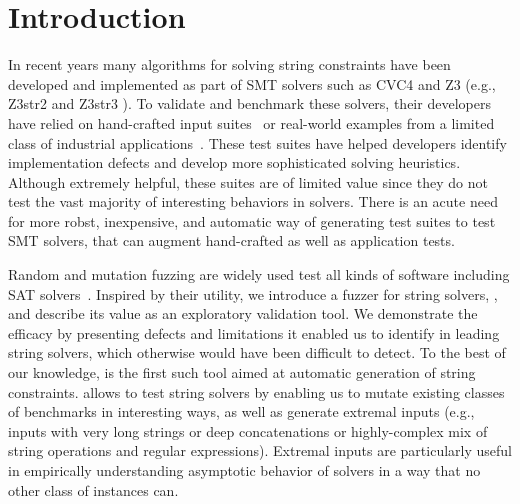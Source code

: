 \section{Introduction}

In recent years many algorithms for solving string constraints have
been developed and implemented as part of SMT solvers such as CVC4
\cite{cvc4} and Z3 (e.g., Z3str2 \cite{z3str2} and Z3str3
\cite{z3str3}). To validate and benchmark these solvers, their
developers have relied on hand-crafted input
suites~\cite{cvc4-tests,z3str3-tests,z3str2-tests} or real-world
examples from a limited class of industrial
applications~\cite{kaluza,kausler}. These test suites have helped
developers identify implementation defects and develop more
sophisticated solving heuristics. Although extremely helpful, these
suites are of limited value since they do not test the vast majority
of interesting behaviors in solvers. There is an acute need for more
robst, inexpensive, and automatic way of generating test suites to
test SMT solvers, that can augment hand-crafted as well as application
tests.
    
Random and mutation fuzzing are widely used test all kinds of software
including SAT solvers~\cite{}. Inspired by their utility, we introduce
a fuzzer for string solvers, \fuzzer{}, and describe its value as an
exploratory validation tool. We demonstrate the efficacy \fuzzer{} by
presenting defects and limitations it enabled us to identify in
leading string solvers, which otherwise would have been difficult to
detect. To the best of our knowledge, \fuzzer{} is the first such tool
aimed at automatic generation of string constraints. \fuzzer{} allows
to test string solvers by enabling us to mutate existing classes of
benchmarks in interesting ways, as well as generate extremal inputs
(e.g., inputs with very long strings or deep concatenations or
highly-complex mix of string operations and regular
expressions). Extremal inputs are particularly useful in empirically
understanding asymptotic behavior of solvers in a way that no other
class of instances can.


